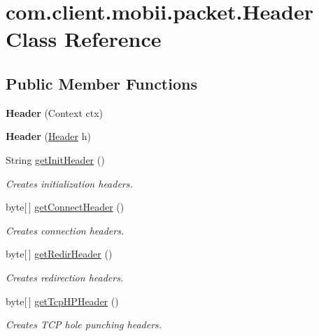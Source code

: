 \hypertarget{classcom_1_1client_1_1mobii_1_1packet_1_1_header}{\section{com.\-client.\-mobii.\-packet.\-Header Class Reference}
\label{classcom_1_1client_1_1mobii_1_1packet_1_1_header}
}
\subsection*{Public Member Functions}
\begin{DoxyCompactItemize}
\item 
\hypertarget{classcom_1_1client_1_1mobii_1_1packet_1_1_header_a92ab78cbd80249971993992c305972b4}{{\bfseries Header} (Context ctx)}\label{classcom_1_1client_1_1mobii_1_1packet_1_1_header_a92ab78cbd80249971993992c305972b4}

\item 
\hypertarget{classcom_1_1client_1_1mobii_1_1packet_1_1_header_a9c43d9f23bd75cd64a6c6c09409e644b}{{\bfseries Header} (\hyperlink{classcom_1_1client_1_1mobii_1_1packet_1_1_header}{Header} h)}\label{classcom_1_1client_1_1mobii_1_1packet_1_1_header_a9c43d9f23bd75cd64a6c6c09409e644b}

\item 
String \hyperlink{classcom_1_1client_1_1mobii_1_1packet_1_1_header_ae23a9bbedf33d27006c59e29fab4b9ed}{get\-Init\-Header} ()
\begin{DoxyCompactList}\small\item\em Creates initialization headers. \end{DoxyCompactList}\item 
byte\mbox{[}$\,$\mbox{]} \hyperlink{classcom_1_1client_1_1mobii_1_1packet_1_1_header_ab3d4401b0567b0563c7fe497c969fccd}{get\-Connect\-Header} ()
\begin{DoxyCompactList}\small\item\em Creates connection headers. \end{DoxyCompactList}\item 
byte\mbox{[}$\,$\mbox{]} \hyperlink{classcom_1_1client_1_1mobii_1_1packet_1_1_header_a5bb8b2d984f58144e1b242c4edbfdaf4}{get\-Redir\-Header} ()
\begin{DoxyCompactList}\small\item\em Creates redirection headers. \end{DoxyCompactList}\item 
byte\mbox{[}$\,$\mbox{]} \hyperlink{classcom_1_1client_1_1mobii_1_1packet_1_1_header_a29124164f36901fad213ab3e8763e243}{get\-Tcp\-H\-P\-Header} ()
\begin{DoxyCompactList}\small\item\em Creates T\-C\-P hole punching headers. \end{DoxyCompactList}\end{DoxyCompactItemize}


